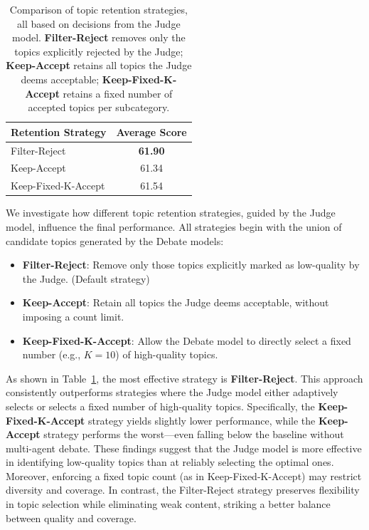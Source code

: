 \documentclass{article}
\theoremstyle{plain}
\theoremstyle{definition}
\theoremstyle{remark}
\begin{document}
    \begin{table}[!tbp]
        \centering
        \small
        \begin{tabular}{lc}
        \toprule
        \textbf{Retention Strategy} & \textbf{Average Score} \\
        \midrule
        Filter-Reject & \textbf{61.90} \\
        Keep-Accept & 61.34 \\
        Keep-Fixed-K-Accept & 61.54 \\
        \bottomrule
        \end{tabular}
        \caption{
            Comparison of topic retention strategies, all based on decisions from the Judge model. 
            \textbf{Filter-Reject} removes only the topics explicitly rejected by the Judge; 
            \textbf{Keep-Accept} retains all topics the Judge deems acceptable; 
            \textbf{Keep-Fixed-K-Accept} retains a fixed number of accepted topics per subcategory.
        }
        \label{tab:topic_retention_strategies}
    \end{table}
    
    We investigate how different topic retention strategies, guided by the Judge model, influence the final performance. All strategies begin with the union of candidate topics generated by the Debate models:

    \begin{itemize}
    \item \textbf{Filter-Reject}: Remove only those topics explicitly marked as low-quality by the Judge. (Default strategy)
    \item \textbf{Keep-Accept}: Retain all topics the Judge deems acceptable, without imposing a count limit.
    \item \textbf{Keep-Fixed-K-Accept}: Allow the Debate model to directly select a fixed number (e.g., $K = 10$) of high-quality topics.
    \end{itemize}

    As shown in Table~\ref{tab:topic_retention_strategies}, the most effective strategy is \textbf{Filter-Reject}. This approach consistently outperforms strategies where the Judge model either adaptively selects or selects a fixed number of high-quality topics. Specifically, the \textbf{Keep-Fixed-K-Accept} strategy yields slightly lower performance, while the \textbf{Keep-Accept} strategy performs the worst—even falling below the baseline without multi-agent debate. These findings suggest that the Judge model is more effective in identifying low-quality topics than at reliably selecting the optimal ones. Moreover, enforcing a fixed topic count (as in Keep-Fixed-K-Accept) may restrict diversity and coverage. In contrast, the Filter-Reject strategy preserves flexibility in topic selection while eliminating weak content, striking a better balance between quality and coverage.
    
\end{document}
